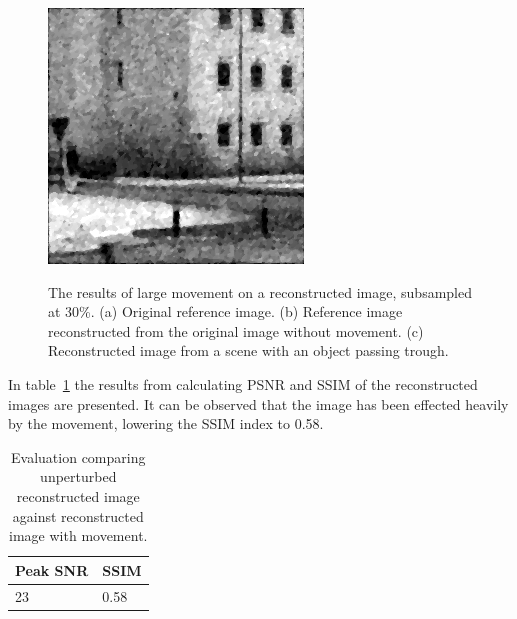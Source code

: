 \begin{figure}[H]
\begin{minipage}[t]{0.32\textwidth}
    \subcaption{}
    \label{fig:fly_2}
\end{minipage}
\begin{minipage}[t]{0.32\textwidth}
    \includegraphics[width = \textwidth]{result/dynamic/fly/flyby_1sec_res_psnr_23_snr_18_sssim_58.png}
    \subcaption{}
    \label{fig:fly_3}
\end{minipage}
    \caption{The results of large movement on a reconstructed image, subsampled at 30\%. (a) Original reference image. (b) Reference image reconstructed from the original image without movement. (c) Reconstructed image from a scene with an object passing trough.}
    \label{fig:fly_dyn}
\end{figure}

In table~\ref{tab:fly_dyn} the results from calculating PSNR and SSIM of the reconstructed images are presented. It can be observed that the image has been effected heavily by the movement, lowering the SSIM index to 0.58. 


\begin{table}[H]
    \centering
  \begin{tabular}{ | l | l |}
    \hline
    Peak SNR  & SSIM \\ \hline
    23 &  0.58 \\ 
    \hline
  \end{tabular}
      \caption{Evaluation comparing unperturbed reconstructed image against reconstructed image with movement.}
    \label{tab:fly_dyn}
\end{table}


